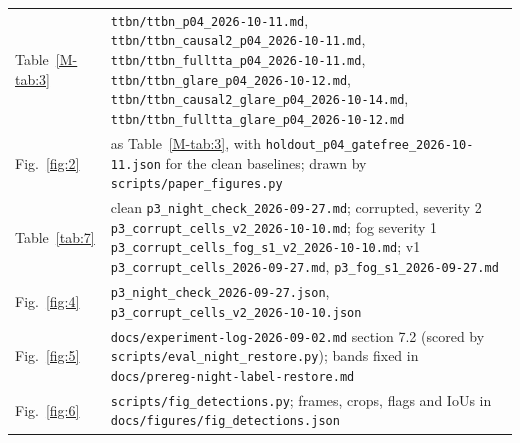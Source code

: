 \documentclass[journal,onecolumn]{IEEEtran}
\begin{document}
\begin{table}[htbp]
\begin{tabularx}{\linewidth}{l>{\raggedright\arraybackslash}X}
Table~\ref{M-tab:3} & \texttt{ttbn/\allowbreak{}ttbn\_\allowbreak{}p04\_\allowbreak{}2026-\allowbreak{}10-\allowbreak{}11.md}, \texttt{ttbn/\allowbreak{}ttbn\_\allowbreak{}causal2\_\allowbreak{}p04\_\allowbreak{}2026-\allowbreak{}10-\allowbreak{}11.md}, \texttt{ttbn/\allowbreak{}ttbn\_\allowbreak{}fulltta\_\allowbreak{}p04\_\allowbreak{}2026-\allowbreak{}10-\allowbreak{}11.md}, \texttt{ttbn/\allowbreak{}ttbn\_\allowbreak{}glare\_\allowbreak{}p04\_\allowbreak{}2026-\allowbreak{}10-\allowbreak{}12.md}, \texttt{ttbn/\allowbreak{}ttbn\_\allowbreak{}causal2\_\allowbreak{}glare\_\allowbreak{}p04\_\allowbreak{}2026-\allowbreak{}10-\allowbreak{}14.md}, \texttt{ttbn/\allowbreak{}ttbn\_\allowbreak{}fulltta\_\allowbreak{}glare\_\allowbreak{}p04\_\allowbreak{}2026-\allowbreak{}10-\allowbreak{}12.md} \\
Fig.~\ref{fig:2} & as Table~\ref{M-tab:3}, with \texttt{holdout\_\allowbreak{}p04\_\allowbreak{}gatefree\_\allowbreak{}2026-\allowbreak{}10-\allowbreak{}11.json} for the clean baselines; drawn by \texttt{scripts/\allowbreak{}paper\_\allowbreak{}figures.py} \\
Table~\ref{tab:7} & clean \texttt{p3\_\allowbreak{}night\_\allowbreak{}check\_\allowbreak{}2026-\allowbreak{}09-\allowbreak{}27.md}; corrupted, severity 2 \texttt{p3\_\allowbreak{}corrupt\_\allowbreak{}cells\_\allowbreak{}v2\_\allowbreak{}2026-\allowbreak{}10-\allowbreak{}10.md}; fog severity 1 \texttt{p3\_\allowbreak{}corrupt\_\allowbreak{}cells\_\allowbreak{}fog\_\allowbreak{}s1\_\allowbreak{}v2\_\allowbreak{}2026-\allowbreak{}10-\allowbreak{}10.md}; v1 \texttt{p3\_\allowbreak{}corrupt\_\allowbreak{}cells\_\allowbreak{}2026-\allowbreak{}09-\allowbreak{}27.md}, \texttt{p3\_\allowbreak{}fog\_\allowbreak{}s1\_\allowbreak{}2026-\allowbreak{}09-\allowbreak{}27.md} \\
Fig.~\ref{fig:4} & \texttt{p3\_\allowbreak{}night\_\allowbreak{}check\_\allowbreak{}2026-\allowbreak{}09-\allowbreak{}27.json}, \texttt{p3\_\allowbreak{}corrupt\_\allowbreak{}cells\_\allowbreak{}v2\_\allowbreak{}2026-\allowbreak{}10-\allowbreak{}10.json} \\
Fig.~\ref{fig:5} & \texttt{docs/\allowbreak{}experiment-\allowbreak{}log-\allowbreak{}2026-\allowbreak{}09-\allowbreak{}02.md} section 7.2 (scored by \texttt{scripts/\allowbreak{}eval\_\allowbreak{}night\_\allowbreak{}restore.py}); bands fixed in \texttt{docs/\allowbreak{}prereg-\allowbreak{}night-\allowbreak{}label-\allowbreak{}restore.md} \\
Fig.~\ref{fig:6} & \texttt{scripts/\allowbreak{}fig\_\allowbreak{}detections.py}; frames, crops, flags and IoUs in \texttt{docs/\allowbreak{}figures/\allowbreak{}fig\_\allowbreak{}detections.json} \\

\end{tabularx}
\end{table}
\end{document}
